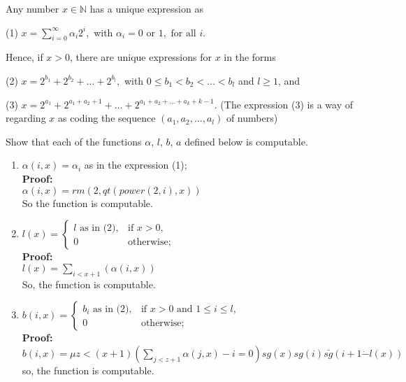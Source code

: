 \documentclass[12pt,a4paper]{article}
\theoremstyle{definition}
\numberwithin{equation}{section}
\numberwithin{figure}{section}
\begin{document}
\begin{enumerate}
  Any number $x \in \mathbb{N}$ has a unique expression as

  (1) $x=\sum\limits_{i=0}^{\infty} \alpha_{i}2^{i},$ with $\alpha_{i}=0 \mbox{ or } 1,\mbox{ for all }i.$

  Hence, if $x>0$, there are unique expressions for  $x$ in the forms

  (2) $x=2^{b_{1}}+2^{b_{2}}+\ldots+2^{b_{l}},$ with $0\leq b_{1}<b_{2}<...<b_{l}$ and $l \geq 1$, and

  (3) $x=2^{a_{1}}+2^{a_{1}+a_{2}+1}+\ldots+2^{a_{1}+a_{2}+\ldots+a_{k}+k-1}$. %
  {\color{blue}(The expression (3) is a way of regarding $x$ as coding the sequence $(a_{1},a_{2},\ldots,a_{l})$ of numbers)}

  Show that each of the functions $\alpha$, $l$, $b$, $a$ defined below is computable.
    \begin{enumerate}
    \item $\alpha(i,x)=\alpha_{i}$ as in the expression (1);\\
    \textbf{Proof:}\\
    $\alpha(i,x) = rm(2,qt(power(2,i),x))$\\
    So the function is computable.\\
    \item $l(x)=\left\{\begin{array}{ll}
        l \mbox{ as in (2)}, & \mbox{if } x>0,\\
        0& \mbox{otherwise};
        \end{array}\right.$\\
    \textbf{Proof:}\\
    $l(x)= \sum_{i < x+1}(\alpha(i,x))$\\
    So, the function is computable.\\
    
    \item $b(i,x)=\left\{\begin{array}{ll}
        b_{i} \mbox{ as in (2)}, &\mbox{if } x>0 \mbox{ and } 1\leq i \leq l,\\
        0& \mbox{otherwise};
        \end{array}\right.$\\
    \textbf{Proof:}
    $b(i,x)=  \mu z<(x+1)(\sum_{j<z+1} \alpha(j,x)-i=0)sg(x)sg(i) \bar{sg}(i+1 \dot{-} l(x))$\\
    so, the function is computable.\\
    

\end{enumerate}
\end{enumerate}
\end{document}
